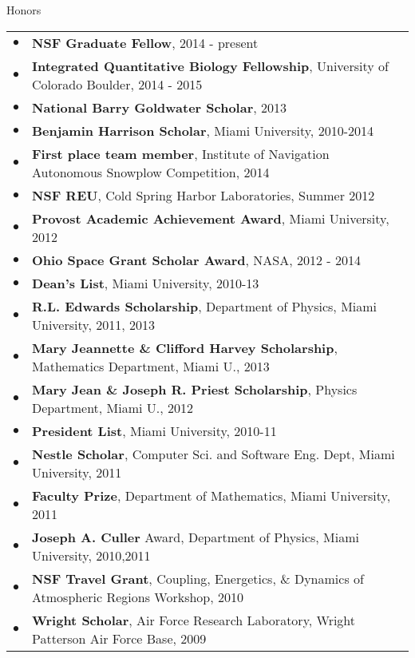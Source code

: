 \documentclass{resume} %
\begin{document}
\begin{rSection}{Honors}
  \begin{tabular}{ll}
    $\bullet$ & \textbf{NSF Graduate Fellow}, 2014 - present\\
    $\bullet$ & \textbf{Integrated Quantitative Biology Fellowship}, University of Colorado Boulder, 2014 - 2015\\
    $\bullet$ & \textbf{National Barry Goldwater Scholar}, 2013\\
    $\bullet$ & \textbf{Benjamin Harrison Scholar}, Miami University, 2010-2014\\
    $\bullet$ & \textbf{First place team member}, Institute of Navigation Autonomous Snowplow Competition, 2014\\
    $\bullet$ & \textbf{NSF REU}, Cold Spring Harbor Laboratories, Summer 2012\\
    $\bullet$ & \textbf{Provost Academic Achievement Award}, Miami University, 2012\\
    $\bullet$ & \textbf{Ohio Space Grant Scholar Award}, NASA, 2012 - 2014\\
    $\bullet$ & \textbf{Dean's List}, Miami University, 2010-13\\
    $\bullet$ & \textbf{R.L. Edwards Scholarship}, Department of Physics, Miami University, 2011, 2013\\
    $\bullet$ & \textbf{Mary Jeannette \& Clifford Harvey Scholarship}, Mathematics Department, Miami U., 2013\\
    $\bullet$ & \textbf{Mary Jean \& Joseph R. Priest Scholarship}, Physics Department, Miami U., 2012\\
    $\bullet$ & \textbf{President List}, Miami University, 2010-11\\
    $\bullet$ & \textbf{Nestle Scholar}, Computer Sci. and Software Eng. Dept, Miami University, 2011\\
    $\bullet$ & \textbf{Faculty Prize}, Department of Mathematics, Miami University, 2011\\
    $\bullet$ & \textbf{Joseph A. Culler} Award, Department of Physics, Miami University, 2010,2011\\
    $\bullet$ & \textbf{NSF Travel Grant}, Coupling, Energetics, \& Dynamics of Atmospheric Regions Workshop, 2010\\
    $\bullet$ & \textbf{Wright Scholar}, Air Force Research Laboratory, Wright Patterson Air Force Base, 2009\\
  \end{tabular}
\end{rSection}\newpage
\end{document}
